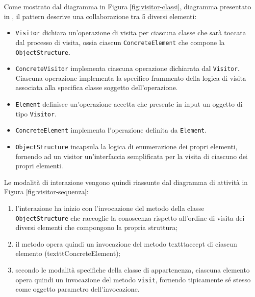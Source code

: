 Come mostrato dal diagramma in Figura \ref{fig:visitor-classi}, diagramma
presentato in \cite{gamma1995design}, il pattern descrive una collaborazione tra
5 diversi elementi:

\begin{itemize}

\item \texttt{Visitor} dichiara un'operazione di visita per ciascuna classe
che sarà toccata dal processo di visita, ossia ciascun
\texttt{ConcreteElement} che compone la \texttt{ObjectStructure}.

\item \texttt{ConcreteVisitor} implementa ciascuna operazione dichiarata dal
\texttt{Visitor}. Ciascuna operazione implementa la specifico frammento della
logica di visita associata alla specifica classe soggetto dell'operazione.

\item \texttt{Element} definisce un'operazione accetta che presente in input un
oggetto di tipo \texttt{Visitor}.

\item \texttt{ConcreteElement} implementa l'operazione definita da
\texttt{Element}.

\item \texttt{ObjectStructure} incapsula la logica di enumerazione dei propri
elementi, fornendo ad un visitor un'interfaccia semplificata per la visita di
ciascuno dei propri elementi.

\end{itemize}

Le modalità di interazione vengono quindi riassunte dal diagramma di attività
in Figura \ref{fig:visitor-sequenza}:

\begin{enumerate}

\item l'interazione ha inizio con l'invocazione del metodo della classe
\texttt{ObjectStructure} che raccoglie la conoscenza rispetto all'ordine di
visita dei diversi elementi che compongono la propria struttura;

\item il metodo opera quindi un invocazione del metodo texttt{accept} di
ciascun elemento (texttt{ConcreteElement});

\item secondo le modalità specifiche della classe di appartenenza, ciascuna
elemento opera quindi un invocazione del metodo \texttt{visit}, fornendo
tipicamente sé stesso come oggetto parametro dell'invocazione.

\end{enumerate}

